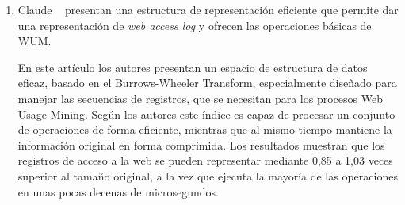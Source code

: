 \begin{enumerate}
  \item Claude \etal~\cite{Claude2014} presentan una estructura de representación eficiente que permite dar una representación de \emph{web access log} y ofrecen las operaciones básicas de WUM.
  
  En este artículo los autores presentan un espacio de estructura de datos eficaz, basado en el Burrows-Wheeler Transform, especialmente diseñado para manejar las secuencias de registros, que se necesitan para los procesos Web Usage Mining. 
  Según los autores este índice es capaz de procesar un conjunto de operaciones de forma eficiente, mientras que al mismo tiempo  mantiene la información original en forma comprimida. Los resultados muestran que los registros de acceso a la web  se pueden representar mediante 0,85 a 1,03 veces superior al tamaño original, a la vez que ejecuta la mayoría de las operaciones en unas pocas decenas de microsegundos.
  
  
  
  
  
 
  
  
\end{enumerate}